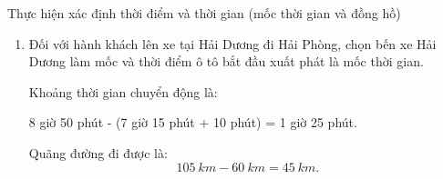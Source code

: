 \begin{dang}{Thực hiện xác định thời điểm và thời gian (mốc thời gian và đồng hồ)}
{\begin{enumerate}[label=\alph*)]
			Khoảng thời gian chuyển động là:	
			\begin{center}
				(8 giờ 50 phút - 6 giờ) - 10 phút = 2 giờ 40 phút.
			\end{center}
			Quãng đường đi được đúng bằng độ dài của đoạn đường Hà Nội - Hải Phòng là $\SI{105}{km}$.
			\item Đối với hành khách lên xe tại Hải Dương đi Hải Phòng, chọn bến xe Hải Dương làm mốc và thời điểm ô tô bắt đầu xuất phát là mốc thời gian.
			
			Khoảng thời gian chuyển động là:
			\begin{center}
				8 giờ 50 phút - (7 giờ 15 phút + 10 phút) = 1 giờ 25 phút.
			\end{center}
			Quãng đường đi được là:
			$$\SI{105}{km}-\SI{60}{km}=\SI{45}{km}.$$
		\end{enumerate}
	}
\end{dang}

